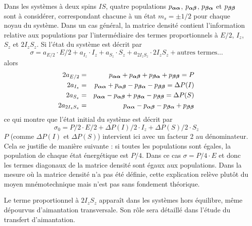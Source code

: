 Dans les systèmes à deux spins $IS$, quatre populations 
$p_{\boldsymbol{\alpha}\boldsymbol{\alpha}}$, $p_{\boldsymbol{\alpha}\boldsymbol{\beta}}$, $p_{\boldsymbol{\beta}\boldsymbol{\alpha}}$ et $p_{\boldsymbol{\beta}\boldsymbol{\beta}}$ sont à 
considérer, correspondant chacune à un état $m_s = \pm 1/2$ pour chaque noyau du système.  
Dans un cas général, la matrice densité contient l'information relative aux populations par 
l'intermédiaire des termes proportionnels à $E/2$, $I_z$, $S_z$ et $2I_zS_z$.
Si l'état du système est décrit par
\begin{equation}
\sigma = a_{E/2} \cdot E/2 + a_{I_z} \cdot I_z + a_{S_z} \cdot S_z + 
a_{2I_zS_z} \cdot 2I_zS_z + \mbox{autres termes...}
\end{equation}
alors
\begin{eqnarray}
2a_{E/2} & = & p_{\boldsymbol{\alpha}\boldsymbol{\alpha}} + p_{\boldsymbol{\alpha}\boldsymbol{\beta}} + p_{\boldsymbol{\beta}\boldsymbol{\alpha}} + p_{\boldsymbol{\beta}\boldsymbol{\beta}} = P \\
2a_{I_z} & = & p_{\boldsymbol{\alpha}\boldsymbol{\alpha}} + p_{\boldsymbol{\alpha}\boldsymbol{\beta}} - p_{\boldsymbol{\beta}\boldsymbol{\alpha}} - p_{\boldsymbol{\beta}\boldsymbol{\beta}} = \Delta P(I) \\
2a_{S_z} & = & p_{\boldsymbol{\alpha}\boldsymbol{\alpha}} - p_{\boldsymbol{\alpha}\boldsymbol{\beta}} + p_{\boldsymbol{\beta}\boldsymbol{\alpha}} - p_{\boldsymbol{\beta}\boldsymbol{\beta}} = \Delta P(S) \\
2a_{2I_zS_z} & = & p_{\boldsymbol{\alpha}\boldsymbol{\alpha}} - p_{\boldsymbol{\alpha}\boldsymbol{\beta}} - p_{\boldsymbol{\beta}\boldsymbol{\alpha}} + p_{\boldsymbol{\beta}\boldsymbol{\beta}} 
\end{eqnarray}
ce qui montre que l'état initial du système est décrit par
\begin{equation}
\sigma_0 = P/2 \cdot {E/2} + \Delta P(I)/2 \cdot I_z + \Delta P(S)/2 \cdot S_z
\end{equation}
$P$ (comme $\Delta P(I)$ et $\Delta P(S)$) intervient ici avec un facteur 2 au dénominateur.
Cela se justifie de manière suivante : si toutes les populations sont égales, la
population de chaque état énergétique est $P/4$.
Dans ce cas $\sigma = P/4 \cdot E$ et donc les termes diagonaux de la matrice densité
sont égaux aux populations.
Dans la mesure où la matrice densité n'a pas été définie, cette explication relève
plutôt du moyen mnémotechnique mais n'est pas sans fondement théorique.

Le terme proportionnel à $2I_zS_z$ apparaît dans les systèmes hors équilibre,
même dépourvus d'aimantation transversale.
Son rôle sera détaillé dans l'étude du transfert d'aimantation.

